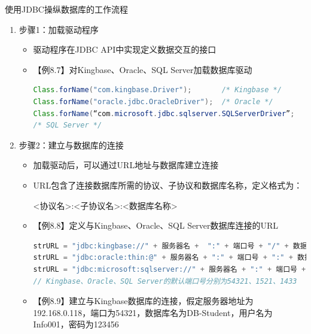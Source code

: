 \begin{frame}{使用JDBC操纵数据库的工作流程}
\begin{enumerate}
    \item 步骤1：加载驱动程序
    \begin{itemize}
        \item 驱动程序在JDBC API中实现定义数据交互的接口
        \item  【例8.7】对Kingbase、Oracle、SQL Server加载数据库驱动
\begin{block}{}
\begin{lstlisting}[language=Java, linewidth=\textwidth]
Class.forName("com.kingbase.Driver");       /* Kingbase */
Class.forName("oracle.jdbc.OracleDriver");  /* Oracle */
Class.forName(“com.microsoft.jdbc.sqlserver.SQLServerDriver”;   
/* SQL Server */
\end{lstlisting}
\end{block}
    \end{itemize}
\framebreak
    \item 步骤2：建立与数据库的连接
\begin{itemize}
    \item 加载驱动后，可以通过URL地址与数据库建立连接
    \item URL包含了连接数据库所需的协议、子协议和数据库名称，定义格式为：
    
    <协议名>:<子协议名>:<数据库名称>
    \item 【例8.8】定义与Kingbase、Oracle、SQL Server数据库连接的URL
\begin{block}{}
\begin{lstlisting}[language=Java, linewidth=\textwidth]
strURL = "jdbc:kingbase://" + 服务器名 +  ":" + 端口号 + "/" + 数据库名;
strURL = "jdbc:oracle:thin:@" + 服务器名 + ":" + 端口号 + ":" + 数据库名
strURL = "jdbc:microsoft:sqlserver://" + 服务器名 + ":" + 端口号 + ":" + 数据库名
// Kingbase、Oracle、SQL Server的默认端口号分别为54321、1521、1433
\end{lstlisting}
\end{block}
    \framebreak
    \item 【例8.9】建立与Kingbase数据库的连接，假定服务器地址为192.168.0.118，端口为54321，数据库名为DB-Student，用户名为Info001，密码为123456
    

\end{itemize}
\end{enumerate}
\end{frame}
